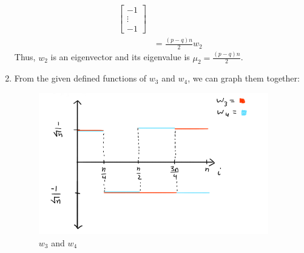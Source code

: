\documentclass[11pt]{article}
\begin{document}
\begin{enumerate}
\begin{align*}
\begin{bmatrix}
		-1  \\
		\vdots \\
		-1
	\end{bmatrix} \\
	&= \frac{(p - q)n}{2} w_2
	\end{align*}
	Thus, $w_2$ is an eigenvector and its eigenvalue is $\boxed{\mu_2 = \frac{(p - q)n}{2}}$.
	\item From the given defined functions of $w_3$ and $w_4$, we can graph them together:
	\begin{figure}[H]
	\includegraphics[width=10cm]{graph.png}
	\centering
	\caption{$w_3$ and $w_4$}
	\end{figure}


\end{enumerate}
\end{document}
